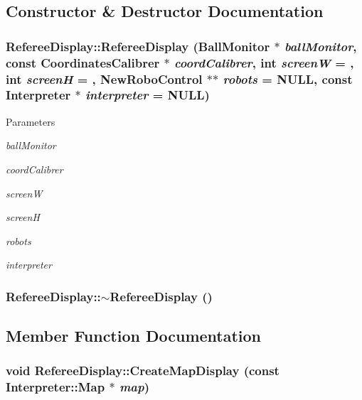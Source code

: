 \subsection{Constructor \& Destructor Documentation}
\hypertarget{classRefereeDisplay_a8f7d4872a24b44b96a36a5bbf991f5d2}{
\subsubsection[{RefereeDisplay}]{\setlength{\rightskip}{0pt plus 5cm}RefereeDisplay::RefereeDisplay ({\bf BallMonitor} $\ast$ {\em ballMonitor}, \/  const {\bf CoordinatesCalibrer} $\ast$ {\em coordCalibrer}, \/  int {\em screenW} = {}, \/  int {\em screenH} = {}, \/  {\bf NewRoboControl} $\ast$$\ast$ {\em robots} = {\ttfamily NULL}, \/  const {\bf Interpreter} $\ast$ {\em interpreter} = {\ttfamily NULL})}}
\label{classRefereeDisplay_a8f7d4872a24b44b96a36a5bbf991f5d2}

\begin{DoxyParams}{Parameters}
\item[{\em ballMonitor}]\item[{\em coordCalibrer}]\item[{\em screenW}]\item[{\em screenH}]\item[{\em robots}]\item[{\em interpreter}]\end{DoxyParams}
\hypertarget{classRefereeDisplay_a5a9191c0d7f937df62ea9544d9e38f3b}{
\subsubsection[{$\sim$RefereeDisplay}]{\setlength{\rightskip}{0pt plus 5cm}RefereeDisplay::$\sim$RefereeDisplay ()}}
\label{classRefereeDisplay_a5a9191c0d7f937df62ea9544d9e38f3b}


\subsection{Member Function Documentation}
\hypertarget{classRefereeDisplay_a9c18f26c62f9507f903ec9b29c1bfea8}{
\subsubsection[{CreateMapDisplay}]{\setlength{\rightskip}{0pt plus 5cm}void RefereeDisplay::CreateMapDisplay (const {\bf Interpreter::Map} $\ast$ {\em map})}}
\label{classRefereeDisplay_a9c18f26c62f9507f903ec9b29c1bfea8}

